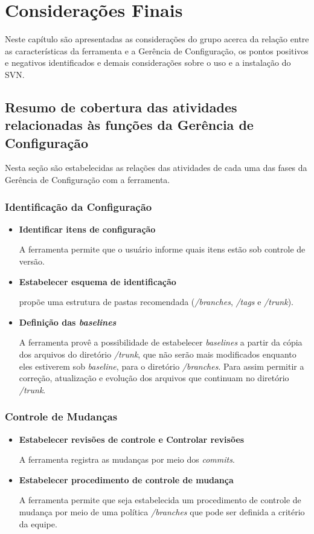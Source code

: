 \chapter[Considerações Finais]{Considerações Finais}

Neste capítulo são apresentadas as considerações do grupo acerca da relação entre as características da ferramenta e a Gerência de Configuração, os
pontos positivos e negativos identificados e demais considerações sobre o uso e a instalação do SVN.

\section{Resumo de cobertura das atividades relacionadas às funções da Gerência de Configuração}

Nesta seção são estabelecidas as relações das atividades de cada uma das fases da Gerência de Configuração com a ferramenta.

 \subsection{Identificação da Configuração}
 \begin{itemize}
  \item \textbf{Identificar itens de configuração}

    A ferramenta permite que o usuário informe quais itens estão sob controle de versão.

  \item \textbf{Estabelecer esquema de identificação}

   propõe uma estrutura de pastas recomendada (\textit{/branches}, \textit{/tags} e \textit{/trunk}).

  \item \textbf{Definição das \textit{baselines}}

  A ferramenta provê a possibilidade de estabelecer \textit{baselines} a partir da cópia dos arquivos do diretório \textit{/trunk},
  que não serão mais modificados enquanto eles estiverem sob \textit{baseline}, para o diretório \textit{/branches}. Para assim permitir a correção, atualização e evolução dos
  arquivos que continuam no diretório \textit{/trunk}.
 \end{itemize}
 \subsection{Controle de Mudanças}
 \begin{itemize}
  \item \textbf{Estabelecer revisões de controle e Controlar revisões}

     A ferramenta registra as mudanças por meio dos \textit{commits}.

  \item \textbf{Estabelecer procedimento de controle de mudança}

  A ferramenta permite que seja estabelecida um procedimento de controle de mudança por meio de uma política \textit{/branches}
  que pode ser definida a critério da equipe.

 \end{itemize}
